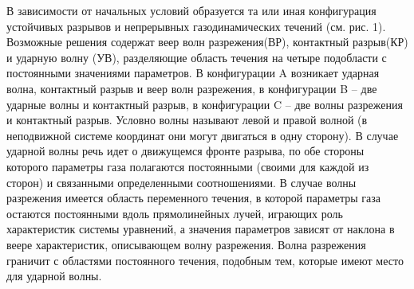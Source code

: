 \documentclass[a4paper,12pt]{extarticle}
\begin{document}
В зависимости от начальных условий образуется та или иная
конфигурация устойчивых разрывов и непрерывных газодинамических течений (см. рис. 1). Возможные
решения содержат веер волн разрежения(ВР), контактный разрыв(КР) и ударную волну (УВ), разделяющие область
течения на четыре подобласти с постоянными значениями параметров. 
В конфигурации A возникает
ударная волна, контактный разрыв и веер волн разрежения, в конфигурации B – две ударные волны и
контактный разрыв, в конфигурации C – две волны разрежения и контактный разрыв. Условно волны
называют левой и правой волной (в неподвижной системе координат они могут двигаться в одну сторону). В случае ударной волны речь идет о движущемся фронте разрыва, по обе стороны которого параметры газа полагаются постоянными (своими для каждой из сторон) и связанными определенными соотношениями. В случае волны разрежения имеется область переменного течения, в которой параметры газа
остаются постоянными вдоль прямолинейных лучей, играющих роль характеристик системы уравнений,
а значения параметров зависят от наклона в веере характеристик, описывающем волну разрежения. Волна разрежения граничит с областями постоянного течения, подобным тем, которые имеют место для
ударной волны. 
\end{document}
